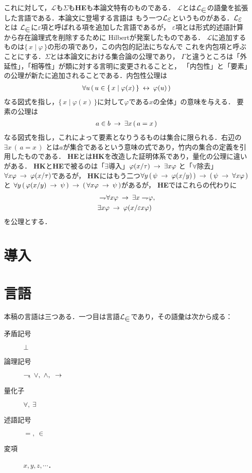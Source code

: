 \documentclass[twocolumn,10pt]{jarticle}
\theoremstyle{mystyle}
\newcommand{\lang}[1]{\mathcal{L}_{\scalebox{1.2}{$#1$}}} %
\newcommand{\Set}[2]{\{\, #1 \mid #2\, \}} %
\newcommand{\negation}{\rightharpoondown\hspace{-0.25em}} %
\newcommand{\rarrow}{\hspace{0.25em}\rightarrow\hspace{0.25em}} %
\newcommand{\lrarrow}{\hspace{0.25em}\leftrightarrow\hspace{0.25em}} %
\begin{document}
	これに対して，$\mathcal{L}$も$\Sigma$も{\bf HE}も本論文特有のものである．
	$\mathcal{L}$とは$\lang{\in}$の語彙を拡張した言語である．本論文に登場する言語は
	もう一つ$\lang{\varepsilon}$というものがある．$\lang{\varepsilon}$とは
	$\lang{\in}$に$\varepsilon$項と呼ばれる項を追加した言語であるが，
	$\varepsilon$項とは形式的述語計算から存在論理式を削除するために
	Hilbert\cite{}が発案したものである．
	$\mathcal{L}$に追加するものは$\Set{x}{\varphi}$の形の項であり，この内包的記法にちなんで
	これを内包項と呼ぶことにする．$\Sigma$とは本論文における集合論の公理であり，
	$\Gamma$と違うところは「外延性」，「相等性」が類に対する言明に変更されることと，
	「内包性」と「要素」の公理が新たに追加されることである．内包性公理は
	\begin{align}
		\forall u\, (\, u \in \Set{x}{\varphi(x)} \lrarrow \varphi(u)\, )
	\end{align}
	なる図式を指し，$\Set{x}{\varphi(x)}$に対して$\varphi$である$x$の全体」の意味を与える．
	要素の公理は
	\begin{align}
		a \in b \rarrow \exists x\, (\, a = x\, )
	\end{align}
	なる図式を指し，これによって要素となりうるものは集合に限られる．右辺の$\exists x\, (\, a = x\, )$
	とは$a$が集合であるという意味の式であり，竹内\cite{}の集合の定義を引用したものである．
	{\bf HE}とは{\bf HK}を改造した証明体系であり，量化の公理に違いがある．
	{\bf HK}と{\bf HE}で被るのは「$\exists$導入」$\varphi(x/\tau) \rarrow \exists x \varphi$
	と「$\forall$除去」$\forall x \varphi \rarrow \varphi(x/\tau)$であるが，
	{\bf HK}にはもう二つ$\forall y\, (\, \psi \rarrow \varphi(x/y)\, )
	\rarrow (\, \psi \rarrow \forall x \varphi\, )$と
	$\forall y\, (\, \varphi(x/y) \rarrow \psi\, )
	\rarrow (\, \forall x \varphi \rarrow \psi\, )$があるが，
	{\bf HE}ではこれらの代わりに
	\begin{align}
		&\negation \forall x \varphi \rarrow \exists x \negation \varphi, \\
		&\exists x \varphi \rarrow \varphi(x/\varepsilon x \varphi)
	\end{align}
	を公理とする．
	
\newpage
\section{導入}
\section{言語}
	本稿の言語は三つある．一つ目は言語$\lang{\in}$であり，その語彙は次から成る：
	\begin{description}
		\item[矛盾記号] $\bot$
		\item[論理記号] $\negation,\ \vee,\ \wedge,\ \rarrow$
		\item[量化子] $\forall,\ \exists$
		\item[述語記号] $=,\ \in$
		\item[変項] $x,y,z,\cdots$．
	\end{description}
	
\end{document}
